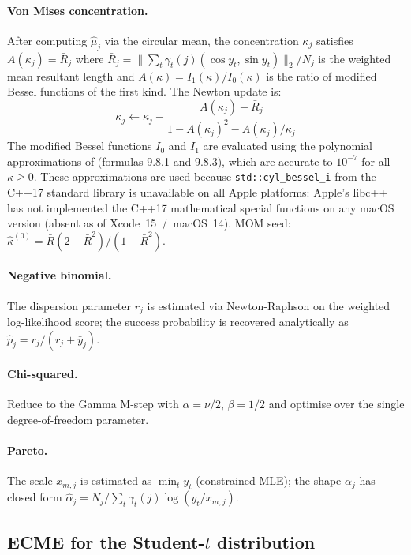 \documentclass[11pt]{article}
\begin{document}
\paragraph{Von Mises concentration.}
After computing $\hat{\mu}_j$ via the circular mean, the concentration
$\kappa_j$ satisfies $A(\kappa_j) = \bar{R}_j$ where
$\bar{R}_j = \|\sum_t \gamma_t(j)(\cos y_t, \sin y_t)\|_2 / N_j$
is the weighted mean resultant length and
$A(\kappa) = I_1(\kappa)/I_0(\kappa)$ is the ratio of modified Bessel
functions of the first kind.
The Newton update is:
\begin{equation}
  \kappa_j \leftarrow \kappa_j - \frac{A(\kappa_j) - \bar{R}_j}{1 - A(\kappa_j)^2 - A(\kappa_j)/\kappa_j}
\end{equation}
The modified Bessel functions $I_0$ and $I_1$ are evaluated using the
polynomial approximations of \citet{AbramowitzStegun1964} (formulas 9.8.1
and 9.8.3), which are accurate to $10^{-7}$ for all $\kappa \geq 0$.
These approximations are used because \texttt{std::cyl\_bessel\_i} from
the C++17 standard library is unavailable on all Apple platforms:
Apple's libc++ has not implemented the C++17 mathematical special functions
on any macOS version (absent as of Xcode~15~/~macOS~14).
MOM seed: $\hat{\kappa}^{(0)} = \bar{R}(2 - \bar{R}^2)/(1 - \bar{R}^2)$.

\paragraph{Negative binomial.}
The dispersion parameter $r_j$ is estimated via Newton-Raphson on the
weighted log-likelihood score; the success probability is recovered
analytically as $\hat{p}_j = r_j / (r_j + \bar{y}_j)$.

\paragraph{Chi-squared.}
Reduce to the Gamma M-step with $\alpha = \nu/2$, $\beta = 1/2$ and
optimise over the single degree-of-freedom parameter.

\paragraph{Pareto.}
The scale $x_{m,j}$ is estimated as $\min_t y_t$ (constrained MLE);
the shape $\alpha_j$ has closed form
$\hat{\alpha}_j = N_j / \sum_t \gamma_t(j) \log(y_t / x_{m,j})$.

\subsection{ECME for the Student-$t$ distribution}
\label{sec:ecme}
\end{document}
